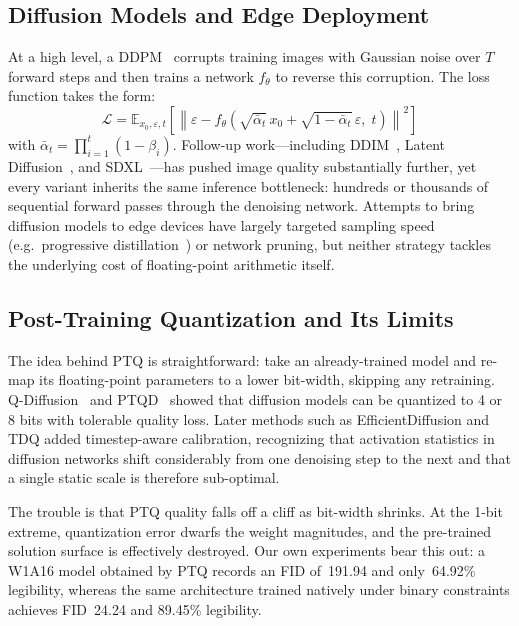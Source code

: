 \documentclass[conference]{IEEEtran}
\begin{document}
\subsection{Diffusion Models and Edge Deployment}

At a high level, a DDPM~\cite{ho2020ddpm} corrupts training images with Gaussian noise
over $T$ forward steps and then trains a network $f_\theta$ to reverse this corruption.
The loss function takes the form:
\begin{equation}
  \mathcal{L} = \mathbb{E}_{x_0,\varepsilon,t}\!\left[
    \left\|\varepsilon - f_\theta\!\left(\sqrt{\bar\alpha_t}\,x_0 +
    \sqrt{1-\bar\alpha_t}\,\varepsilon,\;t\right)\right\|^2\right]
  \label{eq:ddpm}
\end{equation}
with $\bar\alpha_t = \prod_{i=1}^{t}(1-\beta_i)$. Follow-up work---including
DDIM~\cite{song2020ddim}, Latent Diffusion~\cite{rombach2022ldm}, and
SDXL~\cite{podell2023sdxl}---has pushed image quality substantially further, yet every
variant inherits the same inference bottleneck: hundreds or thousands of sequential
forward passes through the denoising network. Attempts to bring diffusion models to edge
devices have largely targeted sampling speed (e.g.\ progressive
distillation~\cite{salimans2022progressive}) or network pruning, but neither strategy
tackles the underlying cost of floating-point arithmetic itself.

\subsection{Post-Training Quantization and Its Limits}

The idea behind PTQ is straightforward: take an already-trained model and re-map its
floating-point parameters to a lower bit-width, skipping any retraining.
Q-Diffusion~\cite{li2023qdiffusion} and PTQD~\cite{he2023ptqd} showed that diffusion
models can be quantized to 4 or 8 bits with tolerable quality loss. Later methods such
as EfficientDiffusion and TDQ added timestep-aware calibration, recognizing that
activation statistics in diffusion networks shift considerably from one denoising step
to the next and that a single static scale is therefore sub-optimal.

The trouble is that PTQ quality falls off a cliff as bit-width shrinks. At the 1-bit
extreme, quantization error dwarfs the weight magnitudes, and the pre-trained solution
surface is effectively destroyed. Our own experiments bear this out: a W1A16 model
obtained by PTQ records an FID of~191.94 and only~64.92\% legibility, whereas the same
architecture trained natively under binary constraints achieves FID~24.24 and 89.45\%
legibility.
\end{document}
